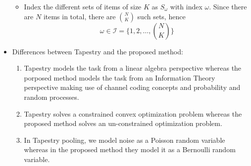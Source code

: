 \documentclass[12pt]{article}
\begin{document}
\begin{itemize}
\begin{itemize}
	\item Index the different sets of items of size $K$ as $S_\omega$ with index $\omega$. Since there are $N$ items in total, there are $N \choose K$ such sets, hence
	$$\omega \in \mathcal{I} = \bigg\{1, 2, \ldots, {N\choose K} \bigg\}$$
\end{itemize}
\item Differences between Tapestry and the proposed method:
\begin{enumerate}
\item  Tapestry models the task from a linear algebra perspective whereas the porposed method models the task from an Information Theory perspective making use of channel coding concepts and probability and random processes.
\item Tapestry solves a constrained convex optimization problem whereas the proposed method solves an un-constrained optimization problem.
\item In Tapestry pooling, we model noise as a Poisson random variable whereas in the proposed method they model it as a Bernoulli random variable.
\end{enumerate}
\end{itemize}
\end{document}
